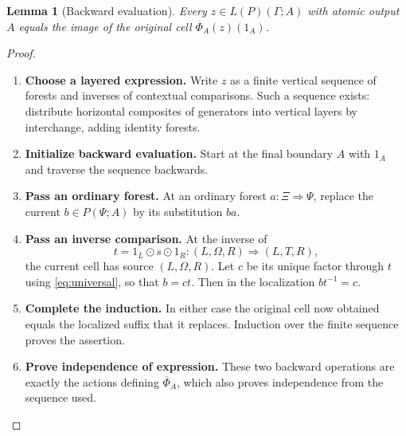 \documentclass[11pt,reqno]{amsart}
\theoremstyle{plain}
\newtheorem{lemma}[theorem]{Lemma}
\theoremstyle{definition}
\theoremstyle{remark}
\numberwithin{equation}{section}
\newcommand{\cell}{\mathrel{\Longrightarrow}}
\newcommand{\wh}{\mathbin{\odot}}
\begin{document}
\begin{lemma}[Backward evaluation]\label{lem:backward}
Every $z\in L(P)(\Gamma;A)$ with atomic output $A$ equals the image of
the original cell $\overline\Phi_A(z)(1_A)$.
\end{lemma}
\begin{proof}\leavevmode
\begin{enumerate}
\item \textbf{Choose a layered expression.} Write $z$ as a finite vertical sequence of forests and inverses of
contextual comparisons. Such a sequence exists: distribute horizontal
composites of generators into vertical layers by interchange, adding
identity forests.

\item \textbf{Initialize backward evaluation.} Start at the final boundary $A$ with $1_A$ and traverse
the sequence backwards.

\item \textbf{Pass an ordinary forest.} At an ordinary forest $a:\Xi\cell\Psi$,
replace the current $b\in P(\Psi;A)$ by its substitution $ba$.

\item \textbf{Pass an inverse comparison.} At the inverse of
\[
 t=1_L\wh s\wh1_R:(L,\Omega,R)\cell(L,T,R),
\]
the current cell has source $(L,\Omega,R)$. Let $c$ be its unique factor
through $t$ using \cref{eq:universal}, so that $b=ct$.
Then in the localization $bt^{-1}=c$.

\item \textbf{Complete the induction.} In either case the original cell
now obtained equals the localized suffix that it replaces. Induction over
the finite sequence proves the assertion.

\item \textbf{Prove independence of expression.} These two backward operations
are exactly the actions defining $\overline\Phi_A$, which also proves
independence from the sequence used.\qedhere
\end{enumerate}
\end{proof}
\end{document}
